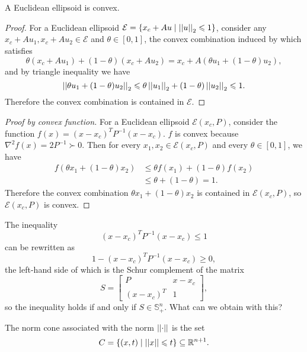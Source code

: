 \documentclass[12pt]{article}
\begin{document}
\begin{proposition}
    A Euclidean ellipsoid is convex.
\end{proposition}
\begin{proof}
    For a Euclidean ellipsoid \(\mathcal E=\left\{x_c+Au\mid\left|\left|u\right|\right|_2\leqslant 1\right\}\), consider any \(x_c+Au_1,x_c+Au_2\in\mathcal E\) and \(\theta\in[0,1]\), the convex combination induced by which satisfies
    \[\theta(x_c+Au_1)+(1-\theta)(x_c+Au_2)=x_c+A(\theta u_1+(1-\theta)u_2),\]
    and by triangle inequality we have
    \[\left|\left|\theta u_1+(1-\theta)u_2\right|\right|_2\leqslant\theta\left|\left|u_1\right|\right|_2+(1-\theta)\left|\left|u_2\right|\right|_2\leqslant 1.\]
    Therefore the convex combination is contained in \(\mathcal E\).
\end{proof}
\begin{proof}[Proof by convex function]
    For a Euclidean ellipsoid \(\mathcal E(x_c,P)\), consider the function \(f(x)=(x-x_c)^TP^{-1}(x-x_c)\). \(f\) is convex because \(\nabla^2f(x)=2P^{-1}\succ 0\). Then for every \(x_1,x_2\in\mathcal E(x_c,P)\) and every \(\theta\in[0,1]\), we have
    \[\begin{aligned}
        f(\theta x_1+(1-\theta)x_2)
        &\leqslant \theta f(x_1)+(1-\theta)f(x_2)\\
        &\leqslant \theta+(1-\theta)=1.
    \end{aligned}\]
    Therefore the convex combination \(\theta x_1+(1-\theta)x_2\) is contained in \(\mathcal E(x_c,P)\), so \(\mathcal E(x_c,P)\) is convex.
\end{proof}

\begin{question}
    The inequality
    \[(x-x_c)^TP^{-1}(x-x_c)\leqslant 1\]
    can be rewritten as
    \[1-(x-x_c)^TP^{-1}(x-x_c)\geqslant 0,\]
    the left-hand side of which is the \textnormal{Schur complement of} the matrix
    \[S=\begin{bmatrix}
        P & x-x_c\\
        (x-x_c)^T & 1
    \end{bmatrix},\]
    so the inequality holds if and only if \(S\in\mathbb S^n_+\). What can we obtain with this?
\end{question}

\begin{definition}
    The \textnormal{norm cone} associated with the norm \(\left|\left|\cdot\right|\right|\) is the set
    \[C=\left\{(x,t)\mid \left|\left|x\right|\right|\leqslant t\right\}\subseteq\mathbb R^{n+1}.\]
\end{definition}
\end{document}
